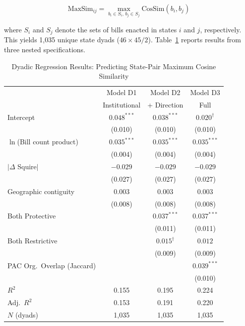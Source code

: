 \begin{equation}
\text{MaxSim}_{ij} = \max_{b_i \in S_i,\, b_j \in S_j} \text{CosSim}(b_i, b_j)
\label{eq:dyadic_dv}
\end{equation}

\noindent where $S_i$ and $S_j$ denote the sets of bills enacted in states $i$ and $j$, respectively. This yields 1,035 unique state dyads ($46 \times 45 / 2$). Table~\ref{tab:dyadic_regression} reports results from three nested specifications.

\begin{table}[htbp]
\centering
\caption{Dyadic Regression Results: Predicting State-Pair Maximum Cosine Similarity}
\label{tab:dyadic_regression}
\small
\begin{tabular}{@{}lccc@{}}
\toprule
 & Model D1 & Model D2 & Model D3 \\
 & Institutional & + Direction & Full \\
\midrule
Intercept
  & $0.048^{***}$ & $0.038^{***}$ & $0.020^{\dagger}$ \\
  & (0.010) & (0.010) & (0.010) \\[6pt]
$\ln$(Bill count product)
  & $0.035^{***}$ & $0.035^{***}$ & $0.035^{***}$ \\
  & (0.004) & (0.004) & (0.004) \\[6pt]
$|\Delta$ Squire$|$
  & $-0.029$ & $-0.029$ & $-0.029$ \\
  & (0.027) & (0.027) & (0.027) \\[6pt]
Geographic contiguity
  & $0.003$ & $0.003$ & $0.003$ \\
  & (0.008) & (0.008) & (0.008) \\[6pt]
Both Protective
  &  & $0.037^{***}$ & $0.037^{***}$ \\
  &  & (0.011) & (0.011) \\[6pt]
Both Restrictive
  &  & $0.015^{\dagger}$ & $0.012$ \\
  &  & (0.009) & (0.009) \\[6pt]
PAC Org.\ Overlap (Jaccard)
  &  &  & $0.039^{***}$ \\
  &  &  & (0.010) \\[6pt]
\midrule
$R^2$          & 0.155 & 0.195 & 0.224 \\
Adj.\ $R^2$   & 0.153 & 0.191 & 0.220 \\
$N$ (dyads)    & 1{,}035 & 1{,}035 & 1{,}035 \\
\bottomrule
\end{tabular}
\par\medskip
\parbox{0.92\textwidth}{\footnotesize
}
\end{table}
